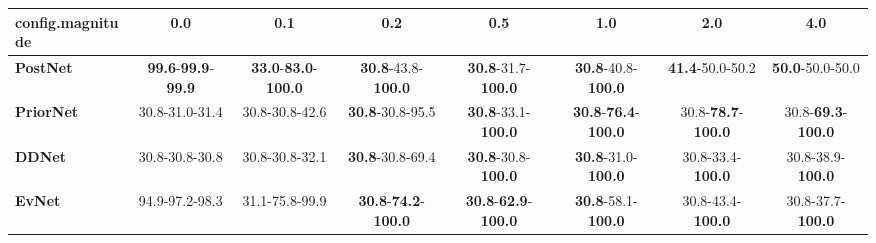 \begin{tabular}{lccccccc}
\toprule
\textbf{config.magnitude} &                                        0.0 &                                         0.1 &                                         0.2 &                                         0.5 &                                         1.0 &                                2.0 &                                4.0 \\
\midrule
\textbf{PostNet } &  \textbf{99.6}-\textbf{99.9}-\textbf{99.9} &  \textbf{33.0}-\textbf{83.0}-\textbf{100.0} &           \textbf{30.8}-43.8-\textbf{100.0} &           \textbf{30.8}-31.7-\textbf{100.0} &           \textbf{30.8}-40.8-\textbf{100.0} &            \textbf{41.4}-50.0-50.2 &            \textbf{50.0}-50.0-50.0 \\
\textbf{PriorNet} &                             30.8-31.0-31.4 &                              30.8-30.8-42.6 &                     \textbf{30.8}-30.8-95.5 &           \textbf{30.8}-33.1-\textbf{100.0} &  \textbf{30.8}-\textbf{76.4}-\textbf{100.0} &  30.8-\textbf{78.7}-\textbf{100.0} &  30.8-\textbf{69.3}-\textbf{100.0} \\
\textbf{DDNet   } &                             30.8-30.8-30.8 &                              30.8-30.8-32.1 &                     \textbf{30.8}-30.8-69.4 &           \textbf{30.8}-30.8-\textbf{100.0} &           \textbf{30.8}-31.0-\textbf{100.0} &           30.8-33.4-\textbf{100.0} &           30.8-38.9-\textbf{100.0} \\
\textbf{EvNet   } &                             94.9-97.2-98.3 &                              31.1-75.8-99.9 &  \textbf{30.8}-\textbf{74.2}-\textbf{100.0} &  \textbf{30.8}-\textbf{62.9}-\textbf{100.0} &           \textbf{30.8}-58.1-\textbf{100.0} &           30.8-43.4-\textbf{100.0} &           30.8-37.7-\textbf{100.0} \\
\bottomrule
\end{tabular}
